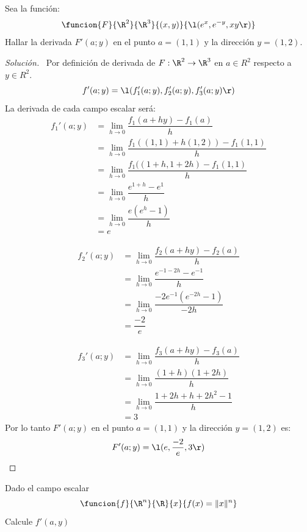 \documentclass[a4,11pt]{aleph-notas}
\begin{document}
\begin{ejer}
Sea la función:
	\[
        \funcion{F}{\R^2}{\R^3}{(x,y)}
        {\l(e^x,e^{-y},xy\r)}
    \]
Hallar la derivada $F'(a;y)$ en el punto $a=(1,1)$ y la dirección $y=(1,2)$.
\end{ejer}

\begin{proof}[Solución]
\
Por definición de derivada de $F: \R^2 \rightarrow \R^3 $ en $a \in R^2$ respecto a $ y\in R^2$.
    \[
       f'(a;y)=\l(f_1'(a;y),f_2'(a;y),f_3'(a;y)\r)
    \]
La derivada de cada campo escalar será:
	\[
    \begin{aligned}
       f_1'(a;y) & = \lim_{h\to 0} \dfrac{f_1(a+hy)-f_1(a)}{h}\\
        & =  \lim_{h\to 0} \dfrac{f_1((1,1)+h(1,2))-f_1(1,1)}{h}\\
        & =  \lim_{h\to 0} \dfrac{f_1((1+h,1+2h)-f_1(1,1)}{h}\\
        & =  \lim_{h\to 0} \dfrac{e^{1+h}-e^1}{h}\\
        & =  \lim_{h\to 0} \dfrac{e(e^h-1)}{h}\\
        & =  e
     \end{aligned}
    \]
    
	\[
    \begin{aligned}
       f_2'(a;y) & = \lim_{h\to 0} \dfrac{f_2(a+hy)-f_2(a)}{h}\\
        & =  \lim_{h\to 0} \dfrac{e^{-1-2h}-e^{-1}}{h}\\
        & =  \lim_{h\to 0} \dfrac{-2e^{-1}(e^{-2h}-1)}{-2h}\\
        & =  \dfrac{-2}{e}
     \end{aligned}
    \]
    
	\[
    \begin{aligned}
       f_3'(a;y) & = \lim_{h\to 0} \dfrac{f_3(a+hy)-f_3(a)}{h}\\
        & =  \lim_{h\to 0} \dfrac{(1+h)(1+2h)}{h}\\
        & =  \lim_{h\to 0} \dfrac{1+2h+h+2h^2-1}{h}\\
        & =  3
     \end{aligned}
    \]
Por lo tanto $F'(a;y)$ en el punto $a=(1,1)$ y la dirección $y=(1,2)$ es:
    \[
       F'(a;y)=\l(e,\dfrac{-2}{e},3\r)
    \]
\end{proof}

\begin{ejer}
Dado el campo escalar
    \[
        \funcion{f}{\R^n}{\R}{x}{f{(x)=\| x \|^n}}
    \]
    Calcule $f'(a,y)$
\end{ejer}
\end{document}

